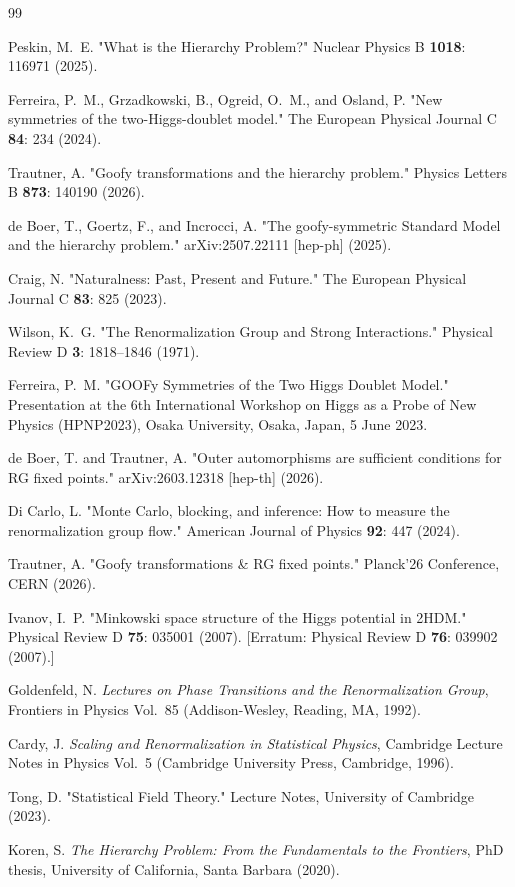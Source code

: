 \documentclass[a4paper, 11pt]{article}
\begin{document}
\begin{thebibliography}{99}

 Peskin, M.~E. "What is the Hierarchy Problem?" Nuclear Physics B {\bf 1018}: 116971 (2025).

 Ferreira, P.~M., Grzadkowski, B., Ogreid, O.~M., and Osland, P. "New symmetries of the two-Higgs-doublet model." The European Physical Journal C {\bf 84}: 234 (2024).

 Trautner, A. "Goofy transformations and the hierarchy problem." Physics Letters B {\bf 873}: 140190 (2026).

 de Boer, T., Goertz, F., and Incrocci, A. "The goofy-symmetric Standard Model and the hierarchy problem." arXiv:2507.22111 [hep-ph] (2025).

 Craig, N. "Naturalness: Past, Present and Future." The European Physical Journal C {\bf 83}: 825 (2023).

 Wilson, K.~G. "The Renormalization Group and Strong Interactions." Physical Review D {\bf 3}: 1818--1846 (1971).

 Ferreira, P.~M. "GOOFy Symmetries of the Two Higgs Doublet Model." Presentation at the 6th International Workshop on Higgs as a Probe of New Physics (HPNP2023), Osaka University, Osaka, Japan, 5 June 2023.

 de Boer, T. and Trautner, A. "Outer automorphisms are sufficient conditions for RG fixed points." arXiv:2603.12318 [hep-th] (2026).

 Di Carlo, L. "Monte Carlo, blocking, and inference: How to measure the renormalization group flow." American Journal of Physics {\bf 92}: 447 (2024).

 Trautner, A. "Goofy transformations \& RG fixed points." Planck'26 Conference, CERN (2026).

 Ivanov, I.~P. "Minkowski space structure of the Higgs potential in 2HDM." Physical Review D {\bf 75}: 035001 (2007). [Erratum: Physical Review D {\bf 76}: 039902 (2007).]

 Goldenfeld, N. \textsl{Lectures on Phase Transitions and the Renormalization Group}, Frontiers in Physics Vol.~85 (Addison-Wesley, Reading, MA, 1992).

 Cardy, J. \textsl{Scaling and Renormalization in Statistical Physics}, Cambridge Lecture Notes in Physics Vol.~5 (Cambridge University Press, Cambridge, 1996).

 Tong, D. "Statistical Field Theory." Lecture Notes, University of Cambridge (2023).

 Koren, S. \textsl{The Hierarchy Problem: From the Fundamentals to the Frontiers}, PhD thesis, University of California, Santa Barbara (2020).

\end{thebibliography}
\end{document}
